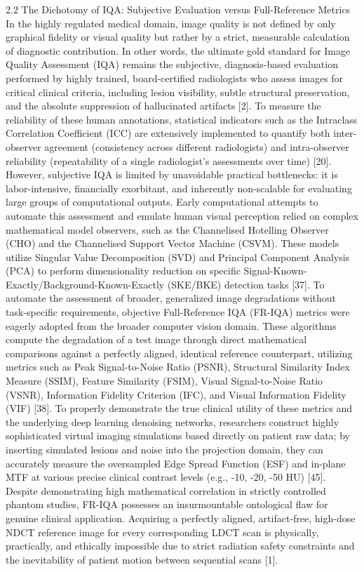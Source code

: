 2.2 The Dichotomy of IQA: Subjective Evaluation versus Full-Reference Metrics In the highly regulated medical domain, image quality is not defined by only graphical fidelity or visual quality but rather by a strict, measurable calculation of diagnostic contribution. In other words, the ultimate gold standard for Image Quality Assessment (IQA) remains the subjective, diagnosis-based evaluation performed by highly trained, board-certified radiologists who assess images for critical clinical criteria, including lesion visibility, subtle structural preservation, and the absolute suppression of hallucinated artifacts [2]. To measure the reliability of these human annotations, statistical indicators such as the Intraclass Correlation Coefficient (ICC) are extensively implemented to quantify both inter-observer agreement (consistency across different radiologists) and intra-observer reliability (repeatability of a single radiologist's assessments over time) [20]. However, subjective IQA is limited by unavoidable practical bottlenecks: it is labor-intensive, financially exorbitant, and inherently non-scalable for evaluating large groups of computational outputs. Early computational attempts to automate this assessment and emulate human visual perception relied on complex mathematical model observers, such as the Channelised Hotelling Observer (CHO) and the Channelised Support Vector Machine (CSVM). These models utilize Singular Value Decomposition (SVD) and Principal Component Analysis (PCA) to perform dimensionality reduction on specific Signal-Known-Exactly/Background-Known-Exactly (SKE/BKE) detection tasks [37]. To automate the assessment of broader, generalized image degradations without task-specific requirements, objective Full-Reference IQA (FR-IQA) metrics were eagerly adopted from the broader computer vision domain. These algorithms compute the degradation of a test image through direct mathematical comparisons against a perfectly aligned, identical reference counterpart, utilizing metrics such as Peak Signal-to-Noise Ratio (PSNR), Structural Similarity Index Measure (SSIM), Feature Similarity (FSIM), Visual Signal-to-Noise Ratio (VSNR), Information Fidelity Criterion (IFC), and Visual Information Fidelity (VIF) [38]. To properly demonstrate the true clinical utility of these metrics and the underlying deep learning denoising networks, researchers construct highly sophisticated virtual imaging simulations based directly on patient raw data; by inserting simulated lesions and noise into the projection domain, they can accurately measure the oversampled Edge Spread Function (ESF) and in-plane MTF at various precise clinical contrast levels (e.g., -10, -20, -50 HU) [45]. Despite demonstrating high mathematical correlation in strictly controlled phantom studies, FR-IQA possesses an insurmountable ontological flaw for genuine clinical application. Acquiring a perfectly aligned, artifact-free, high-dose NDCT reference image for every corresponding LDCT scan is physically, practically, and ethically impossible due to strict radiation safety constraints and the inevitability of patient motion between sequential scans [1].

